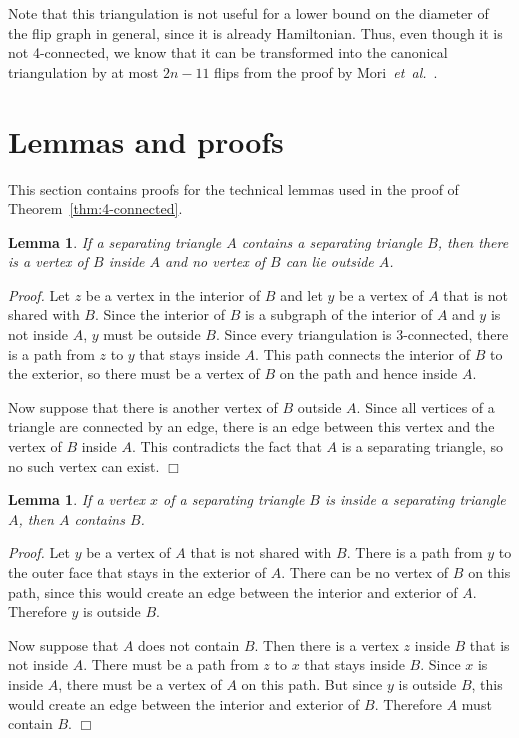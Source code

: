 \pdfoutput=1 \documentclass[12pt]{elsarticle}
\newtheorem{lem}[defin]{Lemma}
\newenvironment{lemma}{\begin{lem} \sl}{\end{lem}}
\newenvironment{proof}{\emph{Proof.}}{\hfill $\Box$ \medskip\\}
\newcommand{\etal}{\emph{et~al.}\xspace}
\begin{document}
\noindent Note that this triangulation is not useful for a lower bound on the diameter of the flip graph in general, since it is already Hamiltonian. Thus, even though it is not 4-connected, we know that it can be transformed into the canonical triangulation by at most $2n - 11$ flips from the proof by Mori~\etal~\cite{mori2003diagonal}.

\section{Lemmas and proofs}
\label{sec:lemmas}

\noindent This section contains proofs for the technical lemmas used in the proof of Theorem~\ref{thm:4-connected}.

\begin{lemma}
 \label{lem:interior}
 If a separating triangle $A$ contains a separating triangle $B$, then there is a vertex of $B$ inside $A$ and no vertex of $B$ can lie outside $A$.
\end{lemma}
\begin{proof}
 Let $z$ be a vertex in the interior of $B$ and let $y$ be a vertex of $A$ that is not shared with $B$. Since the interior of $B$ is a subgraph of the interior of $A$ and $y$ is not inside $A$, $y$ must be outside $B$. Since every triangulation is 3-connected, there is a path from $z$ to $y$ that stays inside $A$. This path connects the interior of $B$ to the exterior, so there must be a vertex of $B$ on the path and hence inside $A$.
 
 Now suppose that there is another vertex of $B$ outside $A$. Since all vertices of a triangle are connected by an edge, there is an edge between this vertex and the vertex of $B$ inside $A$. This contradicts the fact that $A$ is a separating triangle, so no such vertex can exist.
\end{proof}
\vspace{-0.5em}
\begin{lemma}
 \label{lem:interiorvertex}
 If a vertex $x$ of a separating triangle $B$ is inside a separating triangle $A$, then $A$ contains $B$.
\end{lemma}
\begin{proof}
 Let $y$ be a vertex of $A$ that is not shared with $B$. There is a path from $y$ to the outer face that stays in the exterior of $A$. There can be no vertex of $B$ on this path, since this would create an edge between the interior and exterior of $A$. Therefore $y$ is outside $B$.
 
 Now suppose that $A$ does not contain $B$. Then there is a vertex $z$ inside $B$ that is not inside $A$. There must be a path from $z$ to $x$ that stays inside $B$. Since $x$ is inside $A$, there must be a vertex of $A$ on this path. But since $y$ is outside $B$, this would create an edge between the interior and exterior of $B$. Therefore $A$ must contain $B$.
\end{proof}
\end{document}
